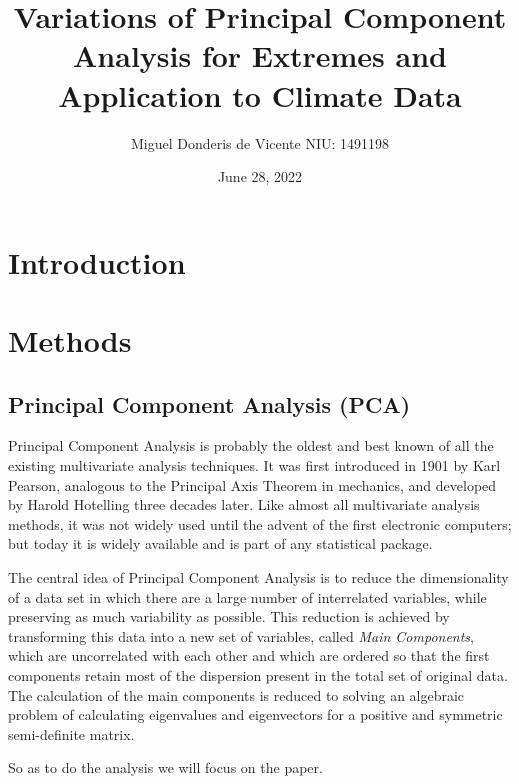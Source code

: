 \documentclass[11pt, oneside]{book}
\title{\textbf{Variations of Principal Component Analysis for Extremes and
Application to Climate Data}}
\author{Miguel Donderis de Vicente \hspace{3mm} NIU: 1491198}
\date{June 28, 2022}
\theoremstyle{plain}
\theoremstyle{remark}
\begin{document}
\maketitle

\tableofcontents
\thispagestyle{empty}

\mainmatter
\chapter{Introduction}
\chapter{Methods}

\section{Principal Component Analysis (PCA)}
Principal Component Analysis is probably the oldest and best known of all the existing
multivariate analysis techniques. It was first introduced in 1901 by Karl
Pearson, analogous to the Principal Axis Theorem in mechanics, and developed by
Harold Hotelling three decades later. Like almost all multivariate analysis
methods, it was not widely used until the advent of the first electronic
computers; but today it is widely available and is part of any statistical
package.

The central idea of Principal Component Analysis is to reduce the dimensionality
of a data set in which there are a large number of interrelated variables, while
preserving as much variability as possible. This reduction is achieved by
transforming this data into a new set of variables, called \emph{Main
Components}, which are uncorrelated with each other and which are ordered so
that the first components retain most of the dispersion present in the total set
of original data. The calculation of the main components is reduced to solving
an algebraic problem of calculating eigenvalues and eigenvectors for a positive
and symmetric semi-definite matrix. 

So as to do the analysis we will focus on the \cite{joliffe} paper.
\end{document}
